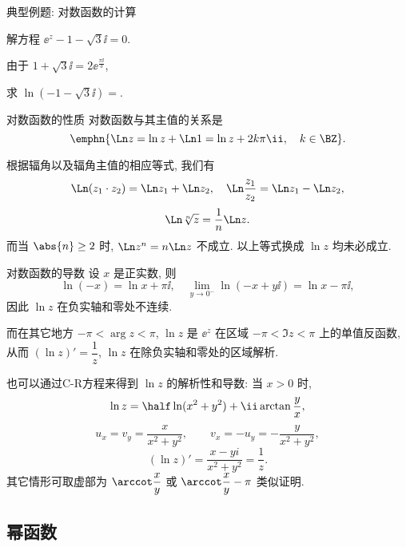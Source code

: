\begin{frame}{典型例题: 对数函数的计算}
	\onslide<+->
	\begin{example}[nearnext]
		解方程 $\ee^z-1-\sqrt 3\ii=0$.
	\end{example}
	\onslide<+->
	\begin{solution}[nearprev]
		由于 $1+\sqrt 3 \ii=2\ee^{\frac{\pi\ii}3}$,
		\bigdel
	\end{solution}

	\onslide<+->
	\begin{exercise}
		求 $\ln(-1-\sqrt3\ii)=$.
	\end{exercise}
\end{frame}


\begin{frame}{对数函数的性质}
	\onslide<+->
	对数函数与其主值的关系是
	\[
		\emphn{\Ln z=\ln z+\Ln 1=\ln z+2k\pi\ii,\quad k\in\BZ}.
	\]

	\onslide<+->
	根据辐角以及辐角主值的相应等式, 我们有
	\[
		\Ln(z_1\cdot z_2)=\Ln z_1+\Ln z_2,\quad
		\Ln\frac{z_1}{z_2}=\Ln z_1-\Ln z_2,
	\]
	\[
		\Ln \sqrt[n]z=\dfrac1n\Ln z.
	\]
	\onslide<+->
	而当 $\abs{n}\ge 2$ 时, \alert{$\Ln z^n=n\Ln z$ 不成立}.
	\onslide<+->
	以上等式换成 $\ln z$ 均未必成立.
\end{frame}


\begin{frame}{对数函数的导数}
\beqskip{1pt}
	\onslide<+->
	设 $x$ 是正实数, 
	\onslide<+->
	则
	\[
		\ln (-x)=\ln x+\pi\ii,\quad
		\lim_{y\to0^-}\ln (-x+y\ii)=\ln x-\pi\ii,
	\]
	\onslide<+->
	因此 $\ln z$ 在负实轴和零处不连续.

	\onslide<+->
	而在其它地方 $-\pi<\arg z<\pi$, $\ln z$ 是 $\ee^z$ 在区域 $-\pi<\Im z<\pi$ 上的单值反函数, 
	\onslide<+->
	从而
	\alert{$(\ln z)'=\dfrac 1z$},
	\alert{$\ln z$ 在除负实轴和零处的区域解析}.

	\onslide<+->
	也可以通过C-R方程来得到 $\ln z$ 的解析性和导数: 当 $x>0$ 时,
	\[
		\ln z=\half \ln(x^2+y^2)+\ii\arctan \frac yx,
	\]
	\onslide<+->
	\[
		u_x=v_y=\frac x{x^2+y^2},\qquad v_x=-u_y=-\frac y{x^2+y^2},
	\]
	\[
		(\ln z)'=\frac{x-yi}{x^2+y^2}=\frac 1z.
	\]
	其它情形可取虚部为 $\arccot\dfrac xy$ 或 $\arccot\dfrac xy-\pi$ 类似证明.
\endgroup
\end{frame}


\subsection{幂函数}

